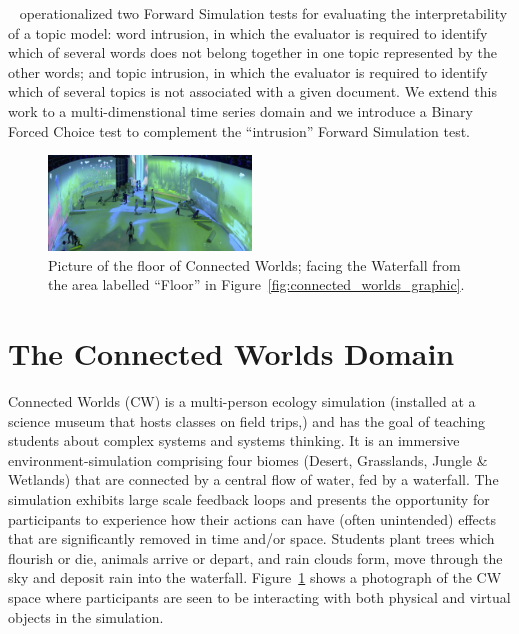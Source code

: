 \documentclass[letterpaper]{article}
\newcommand{\citename}[1]{\citeauthor{#1}~\shortcite{#1}}
\begin{document}
\citename{chang2009reading} operationalized two Forward Simulation tests for evaluating the interpretability of a topic model: word intrusion, in which the evaluator is required to identify which of several words does not belong together in one topic represented by the other words; and  topic intrusion, in which the evaluator is required to
identify which of several topics is not associated with a given document.
We extend this work
to a multi-dimenstional time series domain and we introduce a Binary Forced Choice test to complement the ``intrusion'' Forward Simulation test.
















\begin{figure}[t]
\centering
\includegraphics[width=0.48\textwidth]{./images/cw_viz2.png}
\caption{Picture of the floor of Connected Worlds; facing the Waterfall from the area labelled ``Floor'' in Figure~\ref{fig:connected_worlds_graphic}.}
\label{fig:connected_worlds_viz}
\end{figure}


\section{The Connected Worlds Domain}
\label{sec:cw_desc}
Connected Worlds (CW) is a multi-person ecology simulation (installed at a science museum that hosts classes on field trips,) and has the goal of teaching students about complex systems and systems thinking.
It is an immersive environment-simulation comprising four biomes (Desert, Grasslands, Jungle \& Wetlands) that are connected by a central flow of water, fed by a waterfall. The simulation exhibits large scale feedback loops and presents the opportunity for participants to experience how their actions can have (often unintended) effects that are significantly removed in time and/or space. Students plant trees which flourish or die, animals arrive or depart, and rain clouds form, move through the sky and deposit rain into the waterfall.
Figure~\ref{fig:connected_worlds_viz} shows a photograph of the CW space where participants are seen to be interacting with both physical and virtual objects in the simulation.
\end{document}
